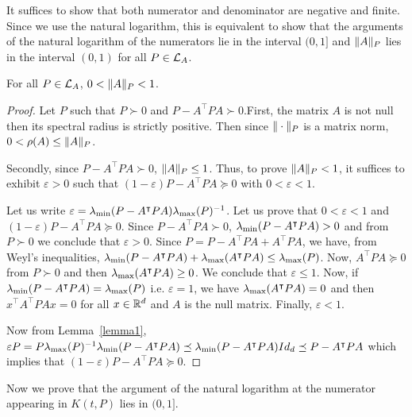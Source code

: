 \documentclass[10pt]{article}
\begin{document}
It suffices to show that both numerator and denominator are negative and finite. Since we use the natural logarithm, this is equivalent to show that the arguments of the natural logarithm of the numerators lie in the interval $(0,1]$ and $\| A\|_P$ lies in the interval $(0,1)$ for all $P\in\mathcal{L}_{A}$. 

\begin{lemma}
\label{lyapnorm}
For all $P\in\mathcal{L}_{A}$, $0<\| A\|_P<1$. 
\end{lemma}

\begin{proof}
Let $P$ such that $P\succ 0$ and $P-A^\intercal P A\succ 0$.First, the matrix $A$ is not null then its spectral radius is strictly positive. Then since $\| \cdot\|_P$ is a matrix norm, $0<\rho(A) \leq \| A\|_P$.

Secondly, since $P-A^\intercal P A\succ 0$, $\| A\|_P\leq 1$. Thus, to prove $\| A\|_P<1$, it suffices to exhibit $\varepsilon>0$ such that $(1-\varepsilon) P-A^\intercal P A\succeq 0$ with $0<\varepsilon<1$. 

Let us write $\varepsilon=\lambda_{\operatorname{min}}(P-A^\intercal P A) \lambda_{\operatorname{max}}(P)^{-1}$. Let us prove that $0<\varepsilon<1$ and $(1-\varepsilon) P-A^\intercal P A\succeq 0$.  Since $P-A^\intercal P A\succ 0$, $\lambda_{\operatorname{min}}(P-A^\intercal P A)>0$ and from $P\succ 0$ we conclude that $\varepsilon >0$. Since $P=P-A^ \intercal P A +A^\intercal P A$, we have, from Weyl's inequalities, $\lambda_{\operatorname{min}}(P-A^\intercal P A)+\lambda_{\operatorname{max}}(A^\intercal P A)\leq \lambda_{\operatorname{max}}(P)$. Now, $A^\intercal P A\succeq 0$ from $P\succ 0$ and then $\lambda_{\operatorname{max}}(A^\intercal P A)\geq 0$. We conclude that $\varepsilon\leq 1$. Now, if $\lambda_{\operatorname{min}}(P-A^\intercal P A)=\lambda_{\operatorname{max}}(P)$ i.e. $\varepsilon=1$, we have 
$\lambda_{\operatorname{max}}(A^\intercal P A)=0$ and then $x^\intercal A^\intercal P A x=0$ for all $x\in \mathbb R^d$ and $A$ is the null matrix. 
Finally, $\varepsilon<1$. 

Now from Lemma~\ref{lemma1}, $\varepsilon P=P\lambda_{\operatorname{max}}(P)^{-1}\lambda_{\operatorname{min}}(P-A^\intercal P A)\preceq \lambda_{\operatorname{min}}(P-A^\intercal P A)Id_d\preceq 
P-A^\intercal P A$ which implies that $(1-\varepsilon) P -A^\intercal P A\succeq 0$. 
\end{proof}

Now we prove that the argument of the natural logarithm at the numerator appearing in $K(t,P)$ lies in $(0,1]$. 
\end{document}
